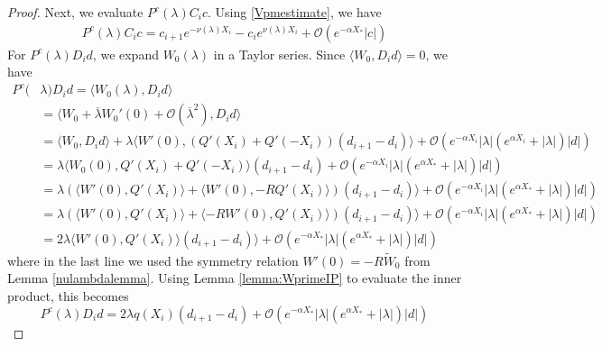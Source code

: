 \documentclass[thesis.tex]{subfiles}
\begin{document}
\begin{lemma}
\begin{proof}
Next, we evaluate $P^c(\lambda)C_i c$. Using \cref{Vpmestimate}, we have
\begin{align}\label{PcCic}
P^c(\lambda)C_i c = 
c_{i+1} e^{-\nu(\lambda)X_i} - c_i e^{\nu(\lambda)X_i} + \mathcal{O}(e^{-\alpha X_*}|c|)
\end{align}
For $P^c(\lambda)D_i d$, we expand $W_0(\lambda)$ in a Taylor series. Since $\langle W_0, D_i d \rangle = 0$, we have 
\begin{align*}
P^c(&\lambda)D_i d = \langle W_0(\lambda), D_i d \rangle \\
&= \langle W_0 + \overline{\lambda} W_0'(0) + \mathcal{O}(\overline{\lambda}^2), D_i d \rangle \\
&= \langle W_0, D_i d \rangle + \lambda \langle W'(0), (Q'(X_i) + Q'(-X_i))(d_{i+1} - d_i ) \rangle + \mathcal{O}(e^{-\alpha X_i} |\lambda|(e^{\alpha X_i} + |\lambda|)|d|) \\
&= \lambda \langle W_0(0), Q'(X_i) + Q'(-X_i) \rangle (d_{i+1} - d_i ) + \mathcal{O}(e^{-\alpha X_i} |\lambda|(e^{\alpha X_*} + |\lambda|)|d|) \\
&= \lambda ( \langle W'(0), Q'(X_i) \rangle + \langle W'(0), -R Q'(X_i)\rangle )(d_{i+1} - d_i ) \rangle + \mathcal{O}(e^{-\alpha X_i} |\lambda|(e^{\alpha X_*} + |\lambda|)|d|)\\
&= \lambda \left( \langle W'(0), Q'(X_i) \rangle + \langle -R W'(0), Q'(X_i)\rangle \right)(d_{i+1} - d_i ) \rangle + \mathcal{O}(e^{-\alpha X_i} |\lambda|(e^{\alpha X_*} + |\lambda|)|d|) \\
&= 2 \lambda \langle W'(0), Q'(X_i) \rangle (d_{i+1} - d_i ) \rangle + \mathcal{O}(e^{-\alpha X_*} |\lambda|(e^{\alpha X_*} + |\lambda|)|d|)
\end{align*}
where in the last line we used the symmetry relation $W'(0) = -R \tilde{W}_0$ from Lemma \ref{nulambdalemma}. Using Lemma \ref{lemma:WprimeIP} to evaluate the inner product, this becomes
\begin{equation}\label{PcDid2}
P^c(\lambda)D_i d = 2 \lambda q(X_i) (d_{i+1} - d_i ) + \mathcal{O}(e^{-\alpha X_*} |\lambda|(e^{\alpha X_*} + |\lambda|)|d|)
\end{equation}


\end{proof}
\end{lemma}
\end{document}
